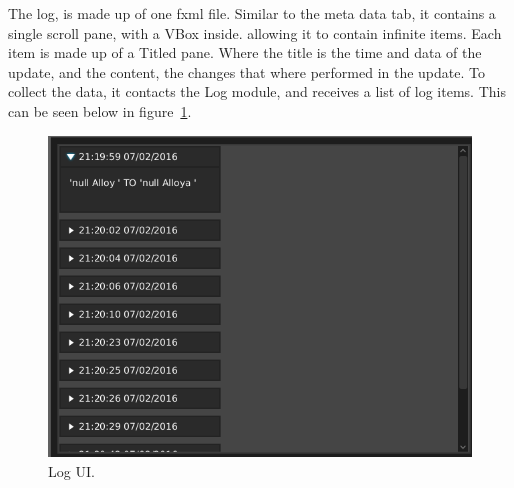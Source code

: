 The log, is made up of one fxml file. Similar to the meta data tab, it contains a single scroll pane, with a VBox inside. allowing it to contain infinite items. Each item is made up of a Titled pane. Where the title is the time and data of the update, and the content, the changes that where performed in the update. To collect the data, it contacts the Log module, and receives a list of log items. This can be seen below in figure~\ref{fig:imp_ui_log}.

\begin{figure}[H]
	\centering
	\includegraphics[scale=0.32]{images/ui_log_final.png}
	\caption{Log UI.}
	\label{fig:imp_ui_log}
\end{figure}
